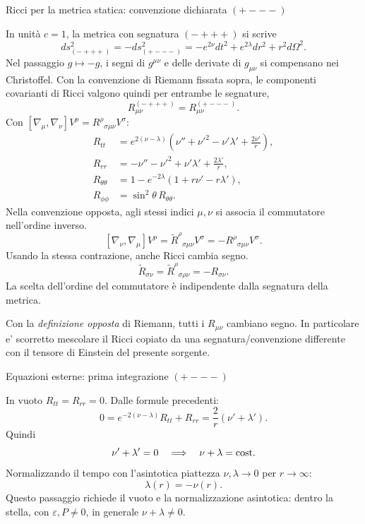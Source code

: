 \begin{frame}[t]{Ricci per la metrica statica: convenzione dichiarata $(+---)$}\small\raggedright
In unità \(c=1\), la metrica con segnatura \((-+++)\) si scrive
\[
ds^2_{(-+++)}=-ds^2_{(+---)}
=-e^{2\nu}dt^2+e^{2\lambda}dr^2+r^2d\Omega^2.
\]
Nel passaggio \(g\mapsto-g\), i segni di \(g^{\mu\nu}\) e delle
derivate di \(g_{\mu\nu}\) si compensano nei Christoffel.
Con la convenzione di Riemann fissata sopra, le componenti
covarianti di Ricci valgono quindi per entrambe le segnature,
\[
R_{\mu\nu}^{(-+++)}=R_{\mu\nu}^{(+---)}.
\]
Con $[\nabla_\mu,\nabla_\nu]V^\rho=R^\rho{}_{\sigma\mu\nu}V^\sigma$:
\[
\begin{aligned}
R_{tt}&=e^{2(\nu-\lambda)}
\left(\nu''+\nu'^2-\nu'\lambda'+\frac{2\nu'}r\right),\\
R_{rr}&=-\nu''-\nu'^2+\nu'\lambda'+\frac{2\lambda'}r,\\
R_{\theta\theta}&=1-e^{-2\lambda}(1+r\nu'-r\lambda'),\\
R_{\phi\phi}&=\sin^2\theta\,R_{\theta\theta}.
\end{aligned}
\]
Nella convenzione opposta, agli stessi indici \(\mu,\nu\)
si associa il commutatore nell'ordine inverso.
\[
[\nabla_\nu,\nabla_\mu]V^\rho
=\widetilde R^\rho{}_{\sigma\mu\nu}V^\sigma
=-R^\rho{}_{\sigma\mu\nu}V^\sigma.
\]
Usando la stessa contrazione, anche Ricci cambia segno.
\[
\widetilde R_{\sigma\nu}
=\widetilde R^\rho{}_{\sigma\rho\nu}
=-R_{\sigma\nu}.
\]
La scelta dell'ordine del commutatore è indipendente
dalla segnatura della metrica.

Con la \emph{definizione opposta} di Riemann, tutti i $R_{\mu\nu}$ cambiano segno.
\medskip
In particolare e' scorretto mescolare il Ricci copiato da una segnatura/convenzione differente con il tensore di Einstein del presente sorgente.

\end{frame}

\begin{frame}[t]{Equazioni esterne: prima integrazione $(+---)$}\small\raggedright

In vuoto $R_{tt}=R_{rr}=0$. Dalle formule precedenti:
\[
0=e^{-2(\nu-\lambda)}R_{tt}+R_{rr}
=\frac{2}{r}(\nu'+\lambda').
\]
Quindi
\[
\nu'+\lambda'=0
\quad\Longrightarrow\quad
\nu+\lambda={\rm cost}.
\]
Normalizzando il tempo con l'asintotica piattezza $\nu,\lambda\to0$ per $r\to\infty$:
\[
\lambda(r)=-\nu(r).
\]
Questo passaggio richiede il vuoto e la normalizzazione asintotica: dentro la stella, con $\varepsilon,P\ne0$, in generale $\nu+\lambda\ne0$.

\end{frame}

